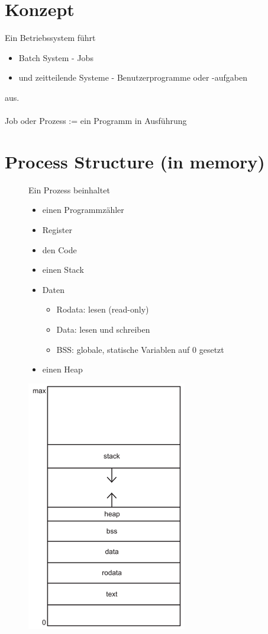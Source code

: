 \documentclass[a4paper]{scrreprt}
\begin{document}
\section{Konzept}
	Ein Betriebssystem führt
	\begin{itemize}
		\item Batch System - Jobs
		\item und zeitteilende Systeme - Benutzerprogramme oder -aufgaben
	\end{itemize} 
	aus.\\\\
	Job oder Prozess := ein Programm in Ausführung
\section{Process Structure (in memory)}
	\begin{figure}[htbp]
		\begin{minipage}[t]{10cm}
			\vspace{0pt}
			Ein Prozess beinhaltet
			\begin{itemize}
				\item einen Programmzähler
				\item Register
				\item den Code
				\item einen Stack
				\item Daten
				\begin{itemize}
					\item Rodata: lesen (read-only)
					\item Data: lesen und schreiben
					\item BSS: globale, statische Variablen auf 0 gesetzt
				\end{itemize}
				\item einen Heap
			\end{itemize}
		\end{minipage}
		\hfill
		\begin{minipage}[t]{4cm}
			\vspace{0pt}
			\centering
			\includegraphics[scale = 0.6]{graphics/memory.png}\\
		\end{minipage}
	\end{figure}
\end{document}
